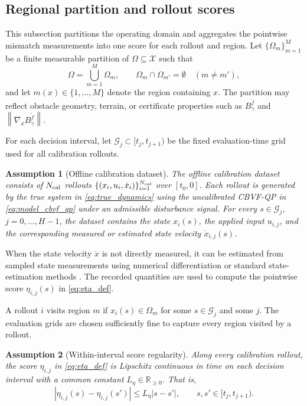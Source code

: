 \documentclass[letterpaper,10pt,conference]{ieeeconf}
\newtheorem{assumption}{Assumption}
\newcommand{\Bm}{B_{\gamma}^{\tilde f}}
\newcommand{\xv}{x}
\newcommand{\uv}{u}
\newcommand{\Xrl}{\mathcal{X}}
\newcommand{\norm}[1]{\left\lVert #1 \right\rVert}
\begin{document}

\subsection{Regional partition and rollout scores}
\label{subsec:regional_scores}

This subsection partitions the operating domain and aggregates the pointwise
mismatch measurements into one score for each rollout and region. Let
$\{\Omega_m\}_{m=1}^M$ be a finite measurable partition of
$\Omega\subseteq\Xrl$ such that
\begin{equation}
    \Omega=\bigcup_{m=1}^M\Omega_m,
    \qquad
    \Omega_m\cap\Omega_{m'}=\emptyset
    \quad (m\ne m'),
    \label{eq:regional_partition}
\end{equation}
and let $m(\xv)\in\{1,\ldots,M\}$ denote the region containing $\xv$. The
partition may reflect obstacle geometry, terrain, or certificate properties
such as $\Bm$ and $\norm{\nabla_{\xv}\Bm}$.

For each decision interval, let
$\mathcal G_j\subset[t_j,t_{j+1})$ be the fixed evaluation-time grid used for
all calibration rollouts.

\begin{assumption}[Offline calibration dataset]
\label{ass:offline_calibration_rollouts}
The offline calibration dataset consists of $N_{\rm cal}$ rollouts
$\{(\xv_i,\uv_i,\dot\xv_i)\}_{i=1}^{N_{\rm cal}}$ over $[t_0,0]$. Each rollout
is generated by the true system in \eqref{eq:true_dynamics} using the
uncalibrated CBVF-QP in \eqref{eq:model_cbvf_qp} under an admissible
disturbance signal. For every $s\in\mathcal G_j$, $j=0,\ldots,H-1$, the
dataset contains the state $\xv_i(s)$, the applied input $u_{i,j}$, and the
corresponding measured or estimated state velocity $\dot\xv_{i,j}(s)$.
\end{assumption}

When the state velocity $\dot\xv$ is not directly measured, it can be estimated from
sampled state measurements using numerical differentiation or standard
state-estimation methods \cite{vanbreugel2020numerical,berkane2021nonlinear,
qin2018vinsmono}. The recorded quantities are used to compute the pointwise
score $\eta_{i,j}(s)$ in \eqref{eq:eta_def}.

A rollout $i$ visits region $m$ if $\xv_i(s)\in\Omega_m$ for some
$s\in\mathcal G_j$ and some $j$. The evaluation grids are chosen sufficiently
fine to capture every region visited by a rollout.

\begin{assumption}[Within-interval score regularity]
\label{ass:inter_sample_score}
Along every calibration rollout, the score $\eta_{i,j}$ in
\eqref{eq:eta_def} is Lipschitz continuous in time on each decision interval
with a common constant $L_\eta\in\mathbb{R}_{\geq 0}$. That is,
\begin{equation}
    |\eta_{i,j}(s)-\eta_{i,j}(s')|
    \leq L_\eta|s-s'|,
    \qquad
    s,s'\in[t_j,t_{j+1}).
    \label{eq:score_lipschitz}
\end{equation}
\end{assumption}
\end{document}
